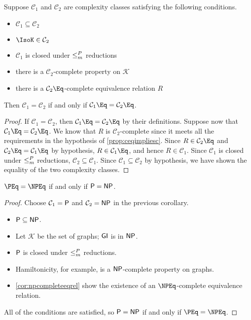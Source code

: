 \begin{proposition}
  Suppose $\mathcal{C}_1$ and $\mathcal{C}_2$ are complexity classes satisfying the following conditions.
  \begin{itemize}
  \item $\mathcal{C}_1 \subseteq \mathcal{C}_2$
  \item $\IsoK \in \mathcal{C}_2$
  \item $\mathcal{C}_1$ is closed under $\mor$ reductions
  \item there is a $\mathcal{C}_2$-complete property on $\mathcal{K}$
  \item there is a $\mathcal{C}_2\Eq$-complete equivalence relation $R$
  \end{itemize}
  Then $\mathcal{C}_1 = \mathcal{C}_2$ if and only if $\mathcal{C}_1\Eq = \mathcal{C}_2\Eq$.
\end{proposition}
\begin{proof}
  If $\mathcal{C}_1 = \mathcal{C}_2$, then $\mathcal{C}_1\Eq = \mathcal{C}_2\Eq$ by their definitions.
  Suppose now that $\mathcal{C}_1\Eq = \mathcal{C}_2\Eq$.
  We know that $R$ is $\mathcal{C}_2$-complete since it meets all the requirements in the hypothesis of \autoref{prop:ceqimpliesc}.
  Since $R \in \mathcal{C}_2\Eq$ and $\mathcal{C}_2\Eq = \mathcal{C}_1\Eq$ by hypothesis, $R \in \mathcal{C}_1\Eq$, and hence $R \in \mathcal{C}_1$.
  Since $\mathcal{C}_1$ is closed under $\mor$ reductions, $\mathcal{C}_2 \subseteq \mathcal{C}_1$.
  Since $\mathcal{C}_1 \subseteq \mathcal{C}_2$ by hypothesis, we have shown the equality of the two complexity classes.
\end{proof}

\begin{corollary}
  $\PEq = \NPEq$ if and only if $\P = \NP$.
\end{corollary}
\begin{proof}
  Choose $\mathcal{C}_1 = \P$ and $\mathcal{C}_2 = \NP$ in the previous corollary.
  \begin{itemize}
  \item $\P \subseteq \NP$.
  \item Let $\mathcal{K}$ be the set of graphs; $\GI$ is in $\NP$.
  \item $\P$ is closed under $\mor$ reductions.
  \item Hamiltonicity, for example, is a $\NP$-complete property on graphs.
  \item \autoref{cor:npcompleteeqrel} show the existence of an $\NPEq$-complete equivalence relation.
  \end{itemize}
  All of the conditions are satisfied, so $\P = \NP$ if and only if $\PEq = \NPEq$.
\end{proof}

